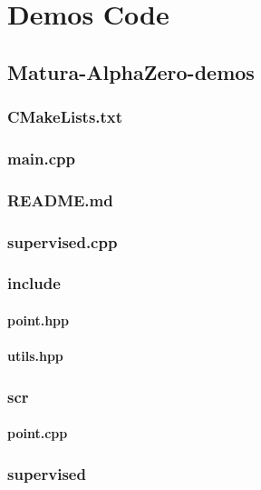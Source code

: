 \documentclass[12pt]{article}
\newcommand{\incDemo}[2]{\label{demo:#2}\newpage}
\begin{document}
\section{Demos Code}
\subsection{Matura-AlphaZero-demos}
\subsubsection{CMakeLists.txt}										\incDemo{python}{CMakeLists.txt}
\subsubsection{main.cpp}												\incDemo{c++}{main.cpp}
\subsubsection{README.md}										\incDemo{python}{README.md}
\subsubsection{supervised.cpp}									\incDemo{c++}{supervised.cpp}
\subsubsection{include}													%
\paragraph{point.hpp}													\incDemo{c++}{include/point.hpp}
\paragraph{utils.hpp}														\incDemo{c++}{include/utils.hpp}
\subsubsection{scr}														%
\paragraph{point.cpp}													\incDemo{c++}{scr/point.cpp}
\subsubsection{supervised}											%
\end{document}
